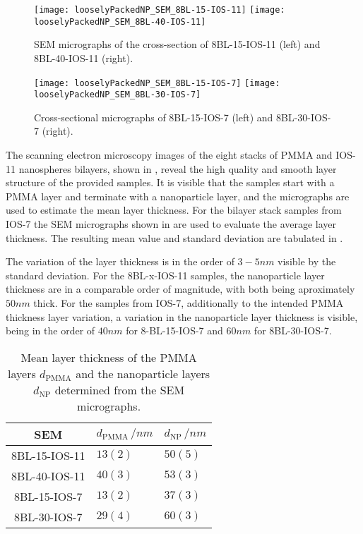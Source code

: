 \documentclass[\main/dresen_thesis.tex]{subfiles}
\begin{document}
  \label{sec:looselyPackedNS:bilayerStacks:sem}
  \begin{figure}[tb]
    \centering
    \texttt{[image: looselyPackedNP\_SEM\_8BL-15-IOS-11]}
    \texttt{[image: looselyPackedNP\_SEM\_8BL-40-IOS-11]}
    \caption{\label{fig:looselyPackedNP:bilayerStacks:sem11}SEM micrographs of the cross-section of 8BL-15-IOS-11 (left) and 8BL-40-IOS-11 (right).}
  \end{figure}
  \begin{figure}[tb]
    \centering
    \texttt{[image: looselyPackedNP\_SEM\_8BL-15-IOS-7]}
    \texttt{[image: looselyPackedNP\_SEM\_8BL-30-IOS-7]}
    \caption{\label{fig:looselyPackedNP:bilayerStacks:sem7}Cross-sectional micrographs of 8BL-15-IOS-7 (left) and 8BL-30-IOS-7 (right).}
  \end{figure}

  The scanning electron microscopy images of the eight stacks of PMMA and IOS-11 nanospheres bilayers, shown in , reveal the high quality and smooth layer structure of the provided samples.
  It is visible that the samples start with a PMMA layer and terminate with a nanoparticle layer, and the micrographs are used to estimate the mean layer thickness.
  For the bilayer stack samples from IOS-7 the SEM micrographs shown in  are used to evaluate the average layer thickness.
  The resulting mean value and standard deviation are tabulated in .

  The variation of the layer thickness is in the order of $3 - 5 \unit{nm}$ visible by the standard deviation.
  For the 8BL-x-IOS-11 samples, the nanoparticle layer thickness are in a comparable order of magnitude, with both being aproximately $50 \unit{nm}$ thick.
  For the samples from IOS-7, additionally to the intended PMMA thickness layer variation, a variation in the nanoparticle layer thickness is visible, being in the order of $40 \unit{nm}$ for 8-BL-15-IOS-7 and $60 \unit{nm}$ for 8BL-30-IOS-7.

  \begin{table}[!htbp]
    \centering
    \caption{\label{tab:looselyPackedNP:bilayerStacks:semLayerThickness}Mean layer thickness of the PMMA layers $d_\mathrm{PMMA}$ and the nanoparticle layers $d_\mathrm{NP}$ determined from the SEM micrographs.}
    \begin{tabular}{ c | l | l}
      \rule{0pt}{2ex} \textbf{SEM}  & $d_\mathrm{PMMA} \, / \unit{nm}$ & $d_\mathrm{NP} \, / \unit{nm}$ \\
      \hline
      8BL-15-IOS-11 & $13(2)$ & $50(5)$\\
      8BL-40-IOS-11 & $40(3)$ & $53(3)$\\
      8BL-15-IOS-7  & $13(2)$ & $37(3)$\\
      8BL-30-IOS-7  & $29(4)$ & $60(3)$\\
      \hline
    \end{tabular}
  \end{table}
\end{document}
